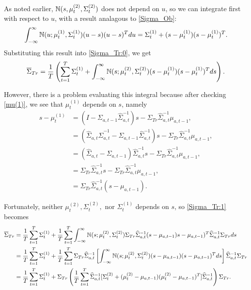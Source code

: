 \documentclass[12pt,leqno]{article}
\begin{document}
As noted earlier, ${\mathbb N}(s,\mu^{(2)}_t,\Sigma^{(2)}_t)$ does not depend on $u$, so we can integrate first with respect to $u$, with a result
analagous to \eqref{Sigma_Ob}:
$$
  \int_{-\infty}^{\infty}{\mathbb N}(u;\mu^{(1)}_t,\Sigma^{(1)}_t)(u-s)(u-s)^Tdu = \Sigma^{(1)}_t + (s-\mu^{(1)}_t)(s-\mu^{(1)}_t)^T.
$$
Substituting this result into \eqref{Sigma_Tr:0}, we get
\begin{equation}\label{Sigma_Tr:1}
  \overline{\Sigma}_{Tr} =  \frac{1}{T}\left(\sum_{t=1}^T\Sigma^{(1)}_t +\int_{-\infty}^{\infty}{\mathbb N}(s;\mu^{(2)}_t,\Sigma^{(2)}_t)
  (s-\mu^{(1)}_t)(s-\mu^{(1)}_t)^Tds\right).
\end{equation}

However, there is a problem evaluating this integral because after checking \eqref{mu(1)}, we see that $\mu^{(1)}_t$
depends on $s$, namely  
\begin{equation}\label{s-mu_1}
    \begin{split}
s - \mu^{(1)}_t &= (I - \Sigma_{a,t-1}\widehat{\Sigma}_{a,t}^{-1})s - \Sigma_{Tr}\widehat{\Sigma}_{a,t}^{-1}\mu_{a,t-1}, \\
  &= (\widehat{\Sigma}_{a,t}\widehat{\Sigma}_{a,t}^{-1} - \Sigma_{a,t-1}\widehat{\Sigma}_{a,t}^{-1})s  - 
  \Sigma_{Tr}\widehat{\Sigma}_{a,t}^{-1}\mu_{a,t-1},\\
  &= (\widehat{\Sigma}_{a,t} - \Sigma_{a,t-1})\widehat{\Sigma}_{a,t}^{-1}s - \Sigma_{Tr}\widehat{\Sigma}_{a,t}^{-1}\mu_{a,t-1},\\
  &= \Sigma_{Tr}\widehat{\Sigma}_{a,t}^{-1}s - \Sigma_{Tr}\widehat{\Sigma}_{a,t}^{-1}\mu_{a,t-1},\\
  &= \Sigma_{Tr}\widehat{\Sigma}_{a,t}^{-1}(s - \mu_{a,t-1}).
    \end{split}
\end{equation}


Fortunately, neither $\mu^{(2)}_t,\Sigma^{(2)}_t,$ nor $\Sigma^{(1)}_t$ depends on $s$,
so \eqref{Sigma_Tr:1} becomes
\begin{align}
  \overline{\Sigma}_{Tr} &= \frac{1}{T}\sum_{t=1}^T\Sigma^{(1)}_t + \frac{1}{T}\sum_{t=1}^T
    \int_{-\infty}^{\infty}{\mathbb N}(s;\mu^{(2)}_t,\Sigma^{(2)}_t)\Sigma_{Tr}\widehat{\Sigma}_{a,t}^{-1}(s-\mu_{a,t-1})
    s-\mu_{a,t-1})^T\widehat{\Sigma}_{a,t}^{-1}\Sigma_{Tr}ds\notag\\
    &=\frac{1}{T}\sum_{t=1}^T\Sigma^{(1)}_t +\frac{1}{T}\sum_{t=1}^T\Sigma_{Tr}\widehat{\Sigma}_{a,t}^{-1}
    \left[\int_{-\infty}^{\infty}{\mathbb N}(s;\mu^{(2)}_t,\Sigma^{(2)}_t)(s-\mu_{a,t-1})(s-\mu_{a,t-1})^Tds\right]\widehat{\Sigma}_{a,t}^{-1}\Sigma_{Tr}\notag\\
   &=\frac{1}{T}\sum_{t=1}^T\Sigma^{(1)}_t+\Sigma_{Tr}\left(\frac{1}{T}\sum_{t=1}^T\widehat{\Sigma}_{a,t}^{-1}
   [\Sigma^{(2)}_t+(\mu^{(2)}_t-\mu_{a,t-1})(\mu^{(2)}_t-\mu_{a,t-1})^T]\widehat{\Sigma}_{a,t}^{-1}\right)\Sigma_{Tr}.\label{Sigma_Tr:2}
  \end{align}
\end{document}

